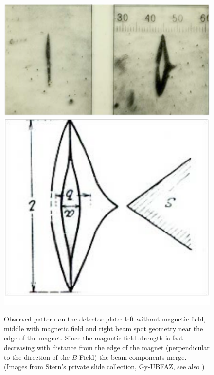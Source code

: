 \documentclass[12pt]{article}
\begin{document}
\begin{figure}
\begin{center}
\includegraphics[scale=0.45]{figures/SGE_pattern}
\includegraphics[scale=0.45]{figures/SGE_pattern2}
\caption{Observed pattern on the detector plate: left without magnetic field, middle with magnetic field and right beam spot geometry near the edge of the magnet. Since the magnetic field strength is fast decreasing with distance from the edge of the magnet (perpendicular to the direction of the $B$-Field) the beam components merge. (Images from Stern's private slide collection, Gy-UBFAZ, see also \cite[pp.~350, 351]{GerlachWEtal1922Nachweis})}
\label{fig:SGEobservedpattern}
\end{center}
\end{figure}
\end{document}
